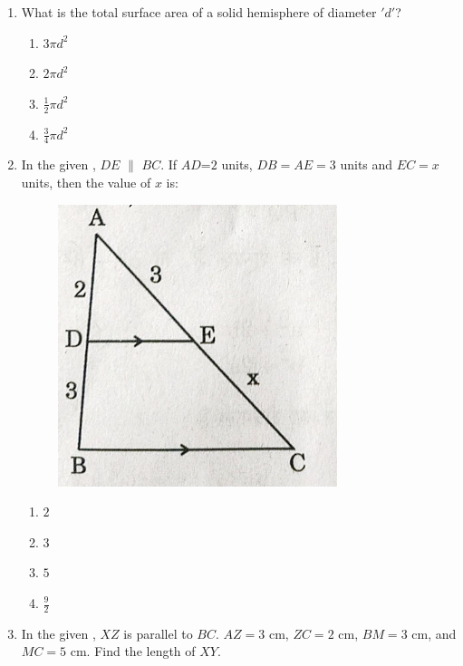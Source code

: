 %
\begin{enumerate}
    \item What is the total surface area of a solid hemisphere of diameter $'d'$?
    \begin{enumerate}
       \item $3$$\pi d^2$  \item $2$$\pi d^2$  \item $\frac{1}{2}\pi d^2$
        \item $\frac{3}{4}\pi d^2$
    \end{enumerate}   
\item  In the given , $DE$ $\parallel$ $BC$. If $AD$=$2$ units, $DB=AE=3$ units and $EC=x$ units, then the value of $x$ is:
\begin{figure}[H]
    \centering
    \includegraphics[width=\columnwidth]{figs/fig6.png}
    \caption{}
    \label{fig:figure1}
\end{figure}
\begin{enumerate}
    \item $2$ \item $3$ \item $5$ \item $\frac{9}{2}$
\end{enumerate}
\item In the given , $XZ$ is parallel to $BC$. $AZ = 3$ cm, $ZC = 2$ cm, $BM = 3$ cm, and $MC = 5$ cm. Find the length of $XY$.


\end{enumerate}
